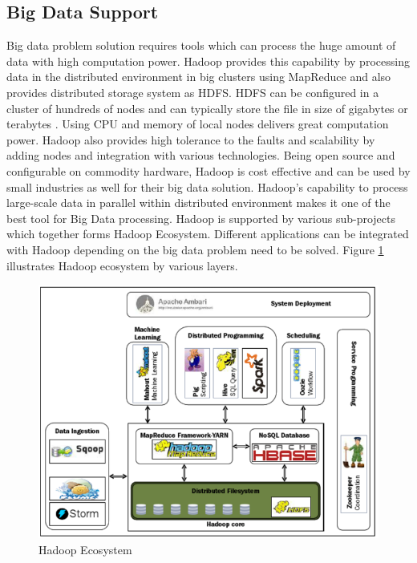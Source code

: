 \documentclass[sigconf]{acmart}
\begin{document}
\subsection{Big Data Support}
Big data problem solution requires tools which can process the huge amount of data with high computation power. Hadoop provides this capability by processing data in the distributed environment in big clusters using MapReduce and also provides distributed storage system as HDFS. HDFS can be configured in a cluster of hundreds of nodes and can typically store the file in size of gigabytes or terabytes \cite{www-hdfs-arch}. Using CPU and memory of local nodes delivers great computation power. Hadoop also provides high tolerance to the faults and scalability by adding nodes and integration with various technologies. Being open source and configurable on commodity hardware, Hadoop is cost effective and can be used by small industries as well for their big data solution. Hadoop's capability to process large-scale data in parallel within distributed environment makes it one of the best tool for Big Data processing. Hadoop is supported by various sub-projects which together forms Hadoop Ecosystem. Different applications can be integrated with Hadoop depending on the big data problem need to be solved.  
Figure \ref{f:hadoopeco} illustrates Hadoop ecosystem by various layers.
\begin{figure}[!ht]
  \centering\includegraphics[width=\columnwidth]{images/hadoopEcosys.PNG}
  \caption{Hadoop Ecosystem \cite[Ch.\ 2, p. 26]{AchariShiva2015HE}}\label{f:hadoopeco}
\end{figure}
\end{document}
